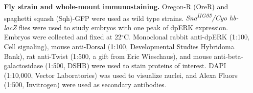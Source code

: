 \documentclass{pnastwo}
\begin{document}
\begin{article}


%





\begin{materials}

\textbf{Fly strain and whole-mount immunostaining.}
%
Oregon-R (OreR) and spaghetti squash (Sqh)-GFP were used as wild type strains. 
%
{\it Sna\textsuperscript{\it IIG05}/Cyo hb-lacZ} flies were used to study embryos with one peak of dpERK expression.  
%
Embryos were collected and fixed at 22$^\circ$C. 
%
Monoclonal rabbit anti-dpERK (1:100, Cell signaling), mouse anti-Dorsal (1:100, Developmental Studies Hybridoma Bank), rat anti-Twist (1:500, a gift from Eric Wieschaus), and mouse anti-beta-galactosidase (1:500, DSHB) were used to stain proteins of interest. DAPI (1:10,000, Vector Laboratories) was used to visualize nuclei, and Alexa Fluors (1:500, Invitrogen) were used as secondary antibodies. 


\end{materials}
\end{article}
\end{document}
